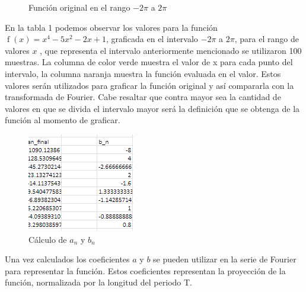 \begin{figure}[H]
    \caption{Función original en el rango \(-2 \pi\) a \(2 \pi\)}
\end{figure}

En la tabla 1 podemos observar los valores para la función \(\operatorname{f}(x) = x^4-5x^2-2x+1\), graficada en el intervalo \(-2 \pi\) a \(2 \pi\), para el rango de valores \(x\) , que representa el intervalo anteriormente mencionado se utilizaron 100 muestras. La columna de color verde muestra el valor de x para cada punto del intervalo, la columna naranja muestra la función evaluada en el valor. Estos valores serán utilizados para graficar la función original y así compararla con la transformada de Fourier. Cabe resaltar que contra mayor sea la cantidad de valores en que se divida el intervalo mayor será la definición que se obtenga de la función al momento de graficar.

\begin{figure}[H]
    \centering
    \includegraphics[width=1.84375in,height=1.69792in]{media/image1.png}
    \caption{Cálculo de \(a_n\) y \(b_n\)}        
\end{figure}

Una vez calculados los coeficientes \(a\) y \(b\) se pueden utilizar en la serie de Fourier para representar la función. Estos coeficientes representan la proyección de la función, normalizada por la longitud del periodo T.

